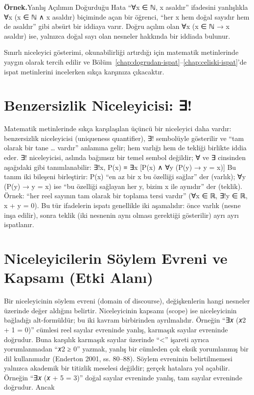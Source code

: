 \begin{tcolorbox}[bookbox,colback=cEx]\textbf{\textsf{\textcolor{cAcc}{Örnek.}}}\quad Yanlış Açılımın Doğurduğu Hata “∀x ∈ ℕ, x asaldır” ifadesini yanlışlıkla ∀x (x ∈ ℕ ∧ x asaldır) biçiminde açan bir öğrenci, “her x hem doğal sayıdır hem de asaldır” gibi absürt bir iddiaya varır. Doğru açılım olan ∀x (x ∈ ℕ → x asaldır) ise, yalnızca doğal sayı olan nesneler hakkında bir iddiada bulunur.\end{tcolorbox}

Sınırlı niceleyici gösterimi, okunabilirliği artırdığı için matematik metinlerinde yaygın olarak tercih edilir ve Bölüm~\ref{chap:dogrudan-ispat}--\ref{chap:celiski-ispat}’de ispat metinlerini incelerken sıkça karşınıza çıkacaktır.

\section{Benzersizlik Niceleyicisi: ∃!}

Matematik metinlerinde sıkça karşılaşılan üçüncü bir niceleyici daha vardır: benzersizlik niceleyicisi (uniqueness quantifier), ∃! sembolüyle gösterilir ve “tam olarak bir tane … vardır” anlamına gelir; hem varlığı hem de tekliği birlikte iddia eder. ∃! niceleyicisi, aslında bağımsız bir temel sembol değildir; ∀ ve ∃ cinsinden aşağıdaki gibi tanımlanabilir: ∃!x, P(x) ≡ ∃x [P(x) ∧ ∀y (P(y) → y = x)] Bu tanım iki bileşeni birleştirir: P(x) “en az bir x bu özelliği sağlar” der (varlık); ∀y (P(y) → y = x) ise “bu özelliği sağlayan her y, bizim x ile aynıdır” der (teklik). Örnek: “her reel sayının tam olarak bir toplama tersi vardır” (∀x ∈ ℝ, ∃!y ∈ ℝ, x + y = 0). Bu tür ifadelerin ispatı genellikle iki aşamalıdır: önce varlık (nesne inşa edilir), sonra teklik (iki nesnenin aynı olması gerektiği gösterilir) ayrı ayrı ispatlanır.

\section{Niceleyicilerin Söylem Evreni ve Kapsamı (Etki Alanı)}

Bir niceleyicinin söylem evreni (domain of discourse), değişkenlerin hangi nesneler üzerinde değer aldığını belirtir. Niceleyicinin kapsamı (scope) ise niceleyicinin bağladığı alt-formüldür; bu iki kavram birbirinden ayrılmalıdır. Örneğin “∃𝑥 (𝑥2 + 1 = 0)” cümlesi reel sayılar evreninde yanlış, karmaşık sayılar evreninde doğrudur. Buna karşılık karmaşık sayılar üzerinde “<” işareti ayrıca yorumlanmadan “𝑥2 ≥ 0” yazmak, yanlış bir cümleden çok eksik yorumlanmış bir dil kullanımıdır (Enderton 2001, ss. 80–88). Söylem evreninin belirtilmemesi yalnızca akademik bir titizlik meselesi değildir; gerçek hatalara yol açabilir. Örneğin “∃𝑥 (𝑥 + 5 = 3)” doğal sayılar evreninde yanlış, tam sayılar evreninde doğrudur. Ancak

